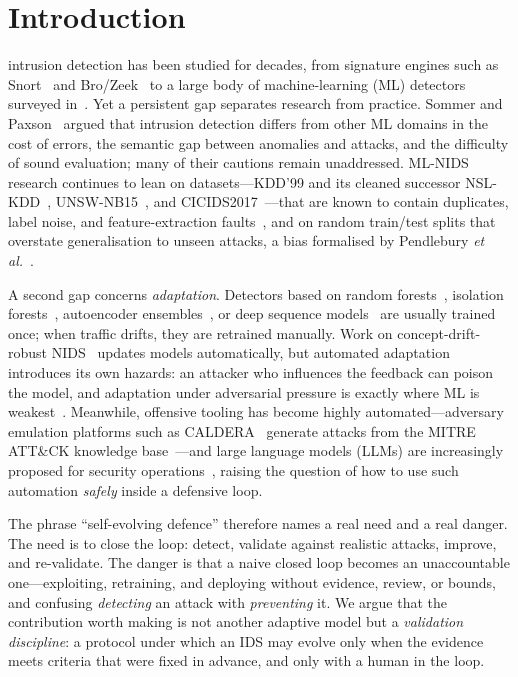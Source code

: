 \documentclass[journal]{IEEEtran}
\begin{document}
\section{Introduction}
 intrusion detection has been studied for decades, from signature engines such
as Snort~\cite{roesch1999snort} and Bro/Zeek~\cite{paxson1999bro} to a large body of machine-learning
(ML) detectors surveyed in~\cite{buczak2016survey}. Yet a persistent gap separates research from
practice. Sommer and Paxson~\cite{sommer2010closed} argued that intrusion detection differs from other
ML domains in the cost of errors, the semantic gap between anomalies and attacks, and the difficulty
of sound evaluation; many of their cautions remain unaddressed. ML-NIDS research continues to lean on
datasets---KDD'99 and its cleaned successor NSL-KDD~\cite{tavallaee2009nslkdd},
UNSW-NB15~\cite{moustafa2015unsw}, and CICIDS2017~\cite{sharafaldin2018cicids}---that are known to
contain duplicates, label noise, and feature-extraction faults~\cite{engelen2021troubleshooting}, and
on random train/test splits that overstate generalisation to unseen attacks, a bias formalised by
Pendlebury \emph{et al.}~\cite{pendlebury2019tesseract}.

A second gap concerns \emph{adaptation}. Detectors based on random forests~\cite{breiman2001random},
isolation forests~\cite{liu2008isolation}, autoencoder ensembles~\cite{mirsky2018kitsune}, or deep
sequence models~\cite{du2017deeplog} are usually trained once; when traffic drifts, they are retrained
manually. Work on concept-drift-robust NIDS~\cite{andresini2021insomnia} updates models
automatically, but automated adaptation introduces its own hazards: an attacker who influences the
feedback can poison the model, and adaptation under adversarial pressure is exactly where ML is
weakest~\cite{biggio2018wild,goodfellow2015adversarial}. Meanwhile, offensive tooling has become
highly automated---adversary emulation platforms such as CALDERA~\cite{applebaum2016caldera} generate
attacks from the MITRE ATT\&CK knowledge base~\cite{strom2018attack}---and large language models
(LLMs) are increasingly proposed for security operations~\cite{zhang2025llm}, raising the question of
how to use such automation \emph{safely} inside a defensive loop.

The phrase ``self-evolving defence'' therefore names a real need and a real danger. The need is to
close the loop: detect, validate against realistic attacks, improve, and re-validate. The danger is
that a naive closed loop becomes an unaccountable one---exploiting, retraining, and deploying without
evidence, review, or bounds, and confusing \emph{detecting} an attack with \emph{preventing} it. We
argue that the contribution worth making is not another adaptive model but a \emph{validation
discipline}: a protocol under which an IDS may evolve only when the evidence meets criteria that were
fixed in advance, and only with a human in the loop.
\end{document}
